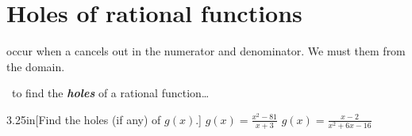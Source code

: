 \section{Holes of rational functions}

  occur when a  cancels out 
in the numerator and denominator.
We must  them from the domain.

\begin{myConceptSteps}{~to find the {\bfseries\itshape holes} of a rational function\dots}
\end{myConceptSteps}


\begin{my2Problems}{3.25in}[Find the holes (if any) of $g(x)$.]
    {
        $g(x) = \frac{x^2 - 81}{x+3}$
    }
    {
        $g(x) = \frac{x-2}{x^2 + 6x -16}$
    }
\end{my2Problems}


